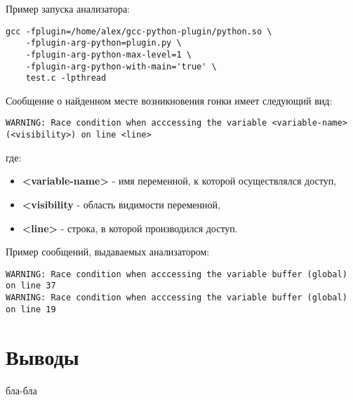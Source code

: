 Пример запуска анализатора:
\begin{verbatim}
gcc -fplugin=/home/alex/gcc-python-plugin/python.so \
    -fplugin-arg-python=plugin.py \
    -fplugin-arg-python-max-level=1 \
    -fplugin-arg-python-with-main='true' \
    test.c -lpthread
\end{verbatim}

Сообщение о найденном месте возникновения гонки имеет следующий вид:
\begin{verbatim}
WARNING: Race condition when acccessing the variable <variable-name> (<visibility>) on line <line>
\end{verbatim}
где:
\begin{itemize}
  \item \textbf{<variable-name>} - имя переменной, к которой осуществлялся доступ,
  \item \textbf{<visibility} - область видимости переменной,
  \item \textbf{<line>} - строка, в которой производился доступ.
\end{itemize}

Пример сообщений, выдаваемых анализатором:
\begin{verbatim}
WARNING: Race condition when acccessing the variable buffer (global) on line 37
WARNING: Race condition when acccessing the variable buffer (global) on line 19
\end{verbatim}

\section{Выводы}

бла-бла
